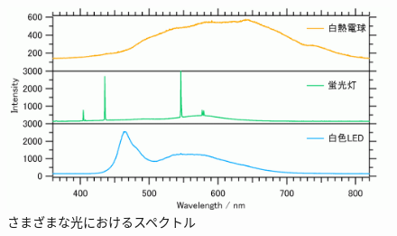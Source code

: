 \begin{figure}
	\centering
	\includegraphics[width=0.6\linewidth]{src/figures/consi1/wave-inte.png}
	\caption{さまざまな光におけるスペクトル}\label{fig:wave-inte}
\end{figure}
